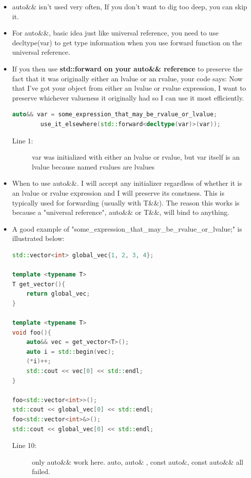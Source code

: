 \documentclass[a4paper,11pt,twoside]{book}
\begin{document}
\begin{itemize}
	
	\item auto\&\& isn't used very often, If you don't want to dig too deep, you can skip it.
	
	\item For auto\&\&, basic idea just like universal reference, you need to use decltype(var) to get type information when you use forward function on the universal reference. 
	
	\item If you then use \textbf{std::forward on your auto\&\& reference} to preserve the fact that it was originally either an lvalue or an rvalue, your code says: Now that I've got your object from either an lvalue or rvalue expression, I want to preserve whichever valueness it originally had so I can use it most efficiently.
	
	\begin{lstlisting}[frame=single, language=c++]
		auto&& var = some_expression_that_may_be_rvalue_or_lvalue;
		use_it_elsewhere(std::forward<decltype(var)>(var));
	\end{lstlisting}
	\begin{description}
		\item[Line 1:] var was initialized with either an lvalue or rvalue, but var itself is an lvalue because named rvalues are lvalues
	\end{description}
	
	\item When to use auto\&\&. I will accept any initializer regardless of whether it is an lvalue or rvalue expression and I will preserve its constness. This is typically used for forwarding (usually with T\&\&). The reason this works is because a "universal reference", auto\&\& or T\&\&, will bind to anything. 
	
	\item A good example of "some\_expression\_that\_may\_be\_rvalue\_or\_lvalue;" is illustrated below:
\begin{lstlisting}[frame=single, language=c++]
std::vector<int> global_vec{1, 2, 3, 4};
		
template <typename T>
T get_vector(){
	return global_vec;
}
		
template <typename T>
void foo(){
	auto&& vec = get_vector<T>(); 
	auto i = std::begin(vec);
	(*i)++;
	std::cout << vec[0] << std::endl;
}
		
foo<std::vector<int>>();
std::cout << global_vec[0] << std::endl;
foo<std::vector<int>&>();
std::cout << global_vec[0] << std::endl;
\end{lstlisting}

	\begin{description}
		\item[Line 10:] only auto\&\& work here. auto, auto\& , const auto\&, const auto\&\& all failed.
	\end{description}
	
\end{itemize}
\end{document}
